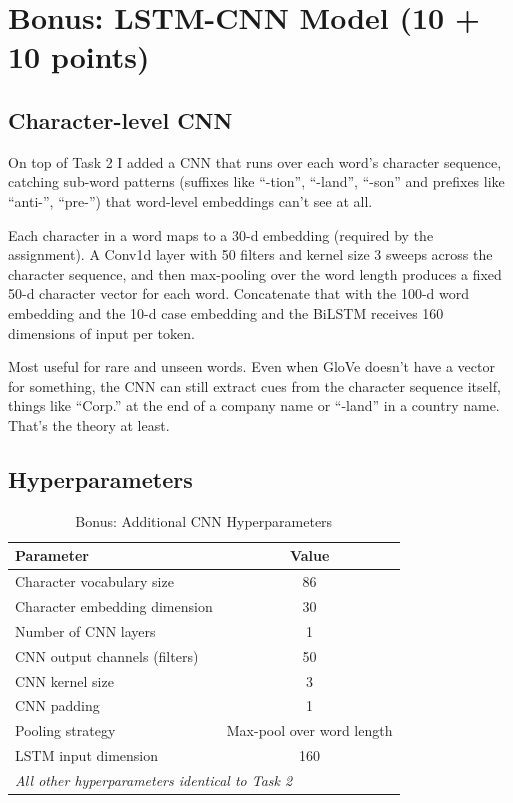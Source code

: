 \documentclass[11pt]{article}
\begin{document}
\section{Bonus: LSTM-CNN Model (10 + 10 points)}

\subsection{Character-level CNN}

On top of Task 2 I added a CNN that runs over each word's character sequence, catching sub-word patterns (suffixes like ``-tion'', ``-land'', ``-son'' and prefixes like ``anti-'', ``pre-'') that word-level embeddings can't see at all.

Each character in a word maps to a 30-d embedding (required by the assignment). A Conv1d layer with 50 filters and kernel size 3 sweeps across the character sequence, and then max-pooling over the word length produces a fixed 50-d character vector for each word. Concatenate that with the 100-d word embedding and the 10-d case embedding and the BiLSTM receives 160 dimensions of input per token.

Most useful for rare and unseen words. Even when GloVe doesn't have a vector for something, the CNN can still extract cues from the character sequence itself, things like ``Corp.'' at the end of a company name or ``-land'' in a country name. That's the theory at least.

\subsection{Hyperparameters}

\begin{table}[h]
\centering
\caption{Bonus: Additional CNN Hyperparameters}
\label{tab:hp3}
\begin{tabular}{lc}
\toprule
\textbf{Parameter} & \textbf{Value} \\
\midrule
Character vocabulary size & 86 \\
Character embedding dimension & 30 \\
Number of CNN layers & 1 \\
CNN output channels (filters) & 50 \\
CNN kernel size & 3 \\
CNN padding & 1 \\
Pooling strategy & Max-pool over word length \\
LSTM input dimension & 160 \\
\midrule
\multicolumn{2}{l}{\textit{All other hyperparameters identical to Task 2}} \\
\bottomrule
\end{tabular}
\end{table}
\end{document}
